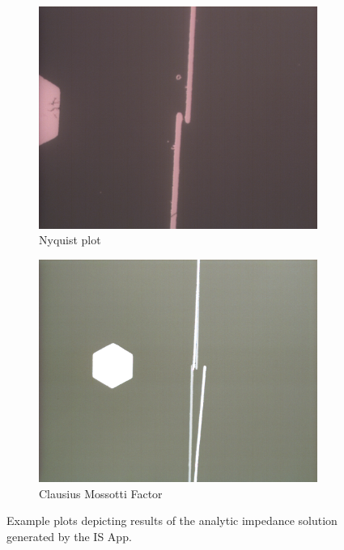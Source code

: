 \begin{figure}[h]
    \\
    \vspace{0.1 in}
    \begin{subfigure}[b]{0.45\textwidth}
        \centering
        \includegraphics[width=\textwidth]{images/electrodeFailureThinBreak.png}
        \caption{Nyquist plot}
    \end{subfigure}
    \hfill
    \begin{subfigure}[b]{0.45\textwidth}
        \centering
        \includegraphics[width=\textwidth]{images/electrodeFailureSlide.png}
        \caption{Clausius Mossotti Factor}
    \end{subfigure}
    \caption{Example plots depicting results of the analytic impedance solution generated by the IS App.}
    \label{fig:failed_elecftrodes_micro}
\end{figure}


